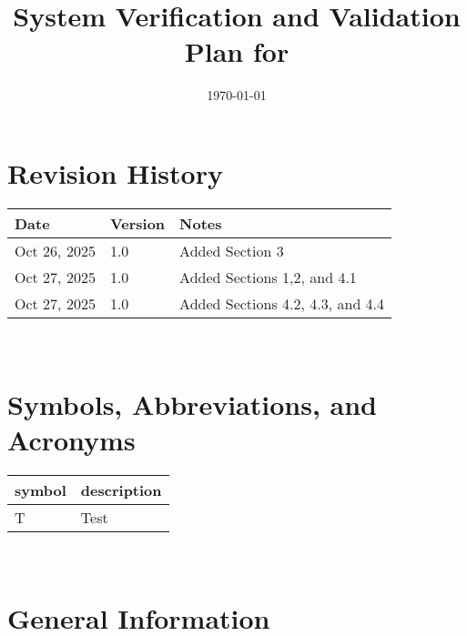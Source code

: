 \documentclass[12pt, titlepage]{article}
\begin{document}
\title{System Verification and Validation Plan for \progname{}} 
\author{\authname}
\date{\today}
	
\maketitle


\section*{Revision History}

\begin{tabularx}{\textwidth}{p{3cm}p{2cm}X}
\toprule {\bf Date} & {\bf Version} & {\bf Notes}\\
\midrule
Oct 26, 2025 & 1.0 & Added Section 3 \\
Oct 27, 2025 & 1.0 & Added Sections 1,2, and 4.1\\
Oct 27, 2025 & 1.0 & Added Sections 4.2, 4.3, and 4.4\\

\bottomrule
\end{tabularx}

~\\


\newpage

\tableofcontents

\listoftables

\listoffigures

\newpage

\section{Symbols, Abbreviations, and Acronyms}

\renewcommand{\arraystretch}{1.2}
\begin{tabular}{l l} 
  \toprule		
  \textbf{symbol} & \textbf{description}\\
  \midrule 
  T & Test\\
  \bottomrule
\end{tabular}\\

\newpage



\section{General Information}
\end{document}
